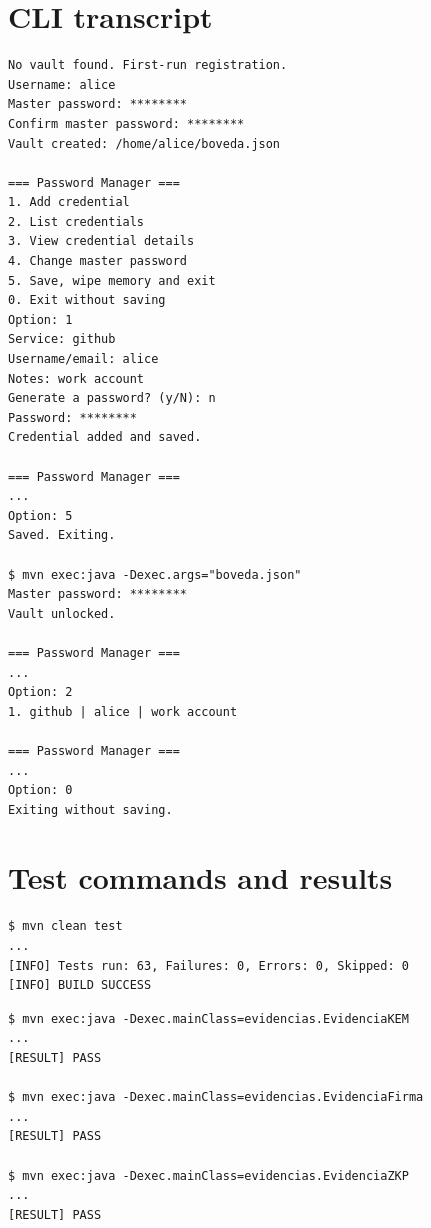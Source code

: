 \documentclass[11pt,a4paper]{article}
\begin{document}
\newpage
\appendix

\section{CLI transcript}

\begin{lstlisting}[style=plaincode,caption={Registration, add, save and reload (abridged).},label={lst:transcript}]
No vault found. First-run registration.
Username: alice
Master password: ********
Confirm master password: ********
Vault created: /home/alice/boveda.json

=== Password Manager ===
1. Add credential
2. List credentials
3. View credential details
4. Change master password
5. Save, wipe memory and exit
0. Exit without saving
Option: 1
Service: github
Username/email: alice
Notes: work account
Generate a password? (y/N): n
Password: ********
Credential added and saved.

=== Password Manager ===
...
Option: 5
Saved. Exiting.

$ mvn exec:java -Dexec.args="boveda.json"
Master password: ********
Vault unlocked.

=== Password Manager ===
...
Option: 2
1. github | alice | work account

=== Password Manager ===
...
Option: 0
Exiting without saving.
\end{lstlisting}

\section{Test commands and results}

\begin{lstlisting}[style=bash,caption={Full test run.},label={lst:testrun}]
$ mvn clean test
...
[INFO] Tests run: 63, Failures: 0, Errors: 0, Skipped: 0
[INFO] BUILD SUCCESS
\end{lstlisting}

\begin{lstlisting}[style=bash,caption={Evidence programs.},label={lst:evidencerun}]
$ mvn exec:java -Dexec.mainClass=evidencias.EvidenciaKEM
...
[RESULT] PASS

$ mvn exec:java -Dexec.mainClass=evidencias.EvidenciaFirma
...
[RESULT] PASS

$ mvn exec:java -Dexec.mainClass=evidencias.EvidenciaZKP
...
[RESULT] PASS
\end{lstlisting}
\end{document}
